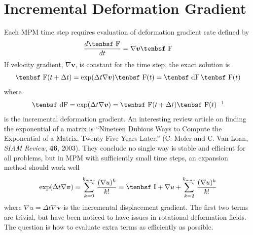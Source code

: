 \documentclass[11pt]{book}
\renewcommand{\vec}[1]{\boldsymbol{#1}}
\def\F{\hbox{\tenbsf F}}
\def\dF{\hbox{\tenbsf dF}}
\def\I{\hbox{\tenbsf I}}
\begin{document}
\section{Incremental Deformation Gradient\label{IDG}}

Each MPM time step requires evaluation of deformation gradient rate defined by
\begin{equation}
    {d\F\over dt} = \nabla\vec v \F
\end{equation}
If velocity gradient, $\nabla \vec v$, is constant for the time step, the exact solution is
\begin{equation}
    \F(t+\Delta t) = \exp(\Delta t \nabla\vec v)\F(t) =\dF \thinspace \F(t)
\end{equation}
where
\begin{equation}
       \dF = \exp(\Delta t \nabla\vec v)= \F(t+\Delta t)\F(t)^{-1}
\end{equation}
is the incremental deformation gradient. An interesting review article on finding the exponential of a matrix is  ``Nineteen Dubious Ways to Compute the Exponential of a Matrix. Twenty Five Years Later.'' (C. Moler and C. Van Loan, {\em SIAM Review}, {\bf 46}, 2003). They conclude no single way is stable and efficient for all problems, but in MPM with sufficiently small time steps, an expansion method should work well
\begin{equation}
    \exp(\Delta t \nabla\vec v) = \sum_{k=0}^{k_{max}} {(\nabla u)^k \over k!} 
            = \I + \nabla u + \sum_{k=2}^{k_{max}} {(\nabla u)^k \over k!}
\end{equation}
where $\nabla u = \Delta t \nabla\vec v$ is the incremental displacement gradient. The first two terms are trivial, but have been noticed to have issues in rotational deformation fields. The question is how to evaluate extra terms as efficiently as possible.
\end{document}
